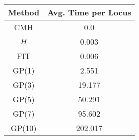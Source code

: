 \centering \begin{tabular}{c|c}
Method	&Avg. Time per Locus\\\hline
CMH	&0.0\\
$H$	&0.003\\
FIT	&0.006\\
GP(1)	&2.551\\
GP(3)	&19.177\\
GP(5)	&50.291\\
GP(7)	&95.602\\
GP(10)	&202.017\\
\end{tabular}
